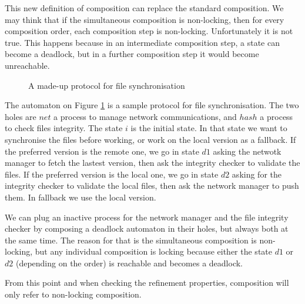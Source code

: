 \documentclass{article}
\begin{document}
This new definition of composition can replace the standard composition.
We may think that if the simultaneous composition is non-locking, then for every composition order, each composition step is non-locking.
Unfortunately it is not true.
This happens because in an intermediate composition step, a state can become a deadlock, but in a further composition step it would become unreachable.
\begin{exi}
\begin{figure}
\centering

\caption{A made-up protocol for file synchronisation}
\label{fig:pnls}
\end{figure}
The automaton on Figure \ref{fig:pnls} is a sample protocol for file synchronisation.
The two holes are \(net\) a process to manage network communications, and \(hash\) a process to check files integrity.
The state \(i\) is the initial state.
In that state we want to synchronise the files before working, or work on the local version as a fallback.
If the preferred version is the remote one, we go in state \(d1\) asking the netwotk manager to fetch the lastest version, then ask the integrity checker to validate the files.
If the preferred version is the local one, we go in state \(d2\) asking for the integrity checker to validate the local files, then ask the network manager to push them.
In fallback we use the local version.

We can plug an inactive process for the network manager and the file integrity checker by composing a deadlock automaton in their holes, but always both at the same time.
The reason for that is the simultaneous composition is non-locking, but any individual composition is locking because either the state \(d1\) or \(d2\) (depending on the order) is reachable and becomes a deadlock.
\end{exi}
From this point and when checking the refinement properties, composition will only refer to non-locking composition.
\end{document}

